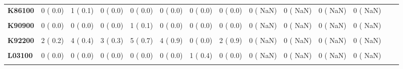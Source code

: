 \documentclass[
]{article}
\begin{document}
\begin{table}[H]
\begin{tabular}[t]{>{\raggedright\arraybackslash}p{5em}ccccccccccccc}
\textbf{K86100} & 0 (  0.0) & 1 (  0.1) & 0 (  0.0) & 0 (  0.0) & 0 (  0.0) & 0 (  0.0) & 0 (  0.0) & 0 (  NaN) & 0 (  NaN) & 0 (  NaN) & 0 (  NaN) &  & \\
\textbf{\cellcolor{gray!10}{K86900}} & \cellcolor{gray!10}{0 (  0.0)} & \cellcolor{gray!10}{0 (  0.0)} & \cellcolor{gray!10}{2 (  0.2)} & \cellcolor{gray!10}{0 (  0.0)} & \cellcolor{gray!10}{0 (  0.0)} & \cellcolor{gray!10}{0 (  0.0)} & \cellcolor{gray!10}{0 (  0.0)} & \cellcolor{gray!10}{0 (  NaN)} & \cellcolor{gray!10}{0 (  NaN)} & \cellcolor{gray!10}{0 (  NaN)} & \cellcolor{gray!10}{0 (  NaN)} & \cellcolor{gray!10}{} & \cellcolor{gray!10}{}\\
\textbf{K90900} & 0 (  0.0) & 0 (  0.0) & 0 (  0.0) & 1 (  0.1) & 0 (  0.0) & 0 (  0.0) & 0 (  0.0) & 0 (  NaN) & 0 (  NaN) & 0 (  NaN) & 0 (  NaN) &  & \\
\textbf{\cellcolor{gray!10}{K92000}} & \cellcolor{gray!10}{1 (  0.1)} & \cellcolor{gray!10}{0 (  0.0)} & \cellcolor{gray!10}{0 (  0.0)} & \cellcolor{gray!10}{0 (  0.0)} & \cellcolor{gray!10}{0 (  0.0)} & \cellcolor{gray!10}{0 (  0.0)} & \cellcolor{gray!10}{0 (  0.0)} & \cellcolor{gray!10}{0 (  NaN)} & \cellcolor{gray!10}{0 (  NaN)} & \cellcolor{gray!10}{0 (  NaN)} & \cellcolor{gray!10}{0 (  NaN)} & \cellcolor{gray!10}{} & \cellcolor{gray!10}{}\\
\textbf{K92200} & 2 (  0.2) & 4 (  0.4) & 3 (  0.3) & 5 (  0.7) & 4 (  0.9) & 0 (  0.0) & 2 (  0.9) & 0 (  NaN) & 0 (  NaN) & 0 (  NaN) & 0 (  NaN) &  & \\
\textbf{\cellcolor{gray!10}{L02200}} & \cellcolor{gray!10}{0 (  0.0)} & \cellcolor{gray!10}{0 (  0.0)} & \cellcolor{gray!10}{0 (  0.0)} & \cellcolor{gray!10}{0 (  0.0)} & \cellcolor{gray!10}{0 (  0.0)} & \cellcolor{gray!10}{0 (  0.0)} & \cellcolor{gray!10}{1 (  0.4)} & \cellcolor{gray!10}{0 (  NaN)} & \cellcolor{gray!10}{0 (  NaN)} & \cellcolor{gray!10}{0 (  NaN)} & \cellcolor{gray!10}{0 (  NaN)} & \cellcolor{gray!10}{} & \cellcolor{gray!10}{}\\
\textbf{L03100} & 0 (  0.0) & 0 (  0.0) & 0 (  0.0) & 0 (  0.0) & 0 (  0.0) & 1 (  0.4) & 0 (  0.0) & 0 (  NaN) & 0 (  NaN) & 0 (  NaN) & 0 (  NaN) &  & \\
\textbf{\cellcolor{gray!10}{L08900}} & \cellcolor{gray!10}{1 (  0.1)} & \cellcolor{gray!10}{0 (  0.0)} & \cellcolor{gray!10}{0 (  0.0)} & \cellcolor{gray!10}{0 (  0.0)} & \cellcolor{gray!10}{0 (  0.0)} & \cellcolor{gray!10}{0 (  0.0)} & \cellcolor{gray!10}{0 (  0.0)} & \cellcolor{gray!10}{0 (  NaN)} & \cellcolor{gray!10}{0 (  NaN)} & \cellcolor{gray!10}{0 (  NaN)} & \cellcolor{gray!10}{0 (  NaN)} & \cellcolor{gray!10}{} & \cellcolor{gray!10}{}\\

\end{tabular}
\end{table}
\end{document}
